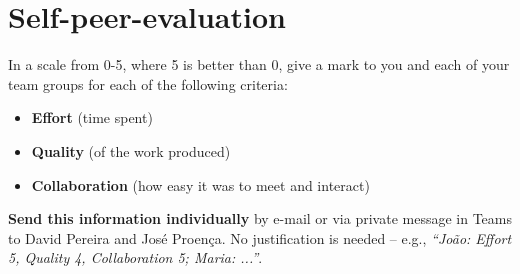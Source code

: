 \documentclass[11pt]{article}
\begin{document}




\section*{Self-peer-evaluation}
\begin{myExercise}
  In a scale from 0-5, where 5 is better than 0, give a mark to you and each of your team groups for each of the following criteria:
  \begin{itemize}
    \item \textbf{Effort} (time spent)
    \item \textbf{Quality} (of the work produced)
    \item \textbf{Collaboration} (how easy it was to meet and interact)
  \end{itemize}
  \textbf{Send this information individually} by e-mail or via private message in Teams to David Pereira and Jos\'{e} Proen\c{c}a. No justification is needed -- e.g., \emph{``Jo\~{a}o: Effort 5, Quality 4, Collaboration 5; Maria: ...''}.
\end{myExercise}


 
\end{document}
